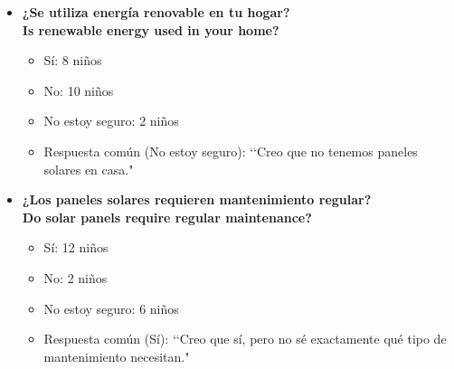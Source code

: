 \documentclass[12pt]{article}
\begin{document}
\begin{itemize}
      \item \textbf{¿Se utiliza energía renovable en tu hogar?}\\
            \textbf{Is renewable energy used in your home?}
            \begin{itemize}
                  \item Sí: 8 niños
                  \item No: 10 niños
                  \item No estoy seguro: 2 niños
                  \item Respuesta común (No estoy seguro): \lq\lq Creo que no tenemos paneles solares en casa."
            \end{itemize}
            \begin{minipage}{\linewidth}
                  \centering
                  \begin{minipage}{0.5\linewidth}
                  \end{minipage}%
            \end{minipage}

      \item \textbf{¿Los paneles solares requieren mantenimiento regular?}\\
            \textbf{Do solar panels require regular maintenance?}
            \begin{itemize}
                  \item Sí: 12 niños
                  \item No: 2 niños
                  \item No estoy seguro: 6 niños
                  \item Respuesta común (Sí): \lq\lq Creo que sí, pero no sé exactamente qué tipo de mantenimiento necesitan."
            \end{itemize}
            \begin{minipage}{\linewidth}
                  \centering
                  \begin{minipage}{0.5\linewidth}
                  \end{minipage}%
            \end{minipage}


\end{itemize}
\end{document}
